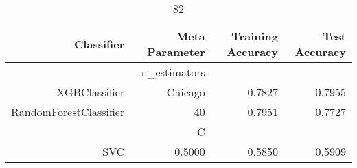
\begin{table}[H]
    \caption{82}
    \centering
    \begin{tabular}{|r|r|r|r|}
        \hline
        Classifier &Meta Parameter &Training Accuracy
        &Test Accuracy\\
        \hline
        &n\_estimators &\multicolumn{2}{|r|}{}\\
        \hline
        XGBClassifier &Chicago &0.7827 &0.7955\\
        \hline
        RandomForestClassifier &40 &0.7951 &0.7727\\
        \hline
        &C &\multicolumn{2}{|r|}{}\\
        \hline
        SVC &0.5000 &0.5850 &0.5909\\
        \hline
    \end{tabular}
\end{table}
